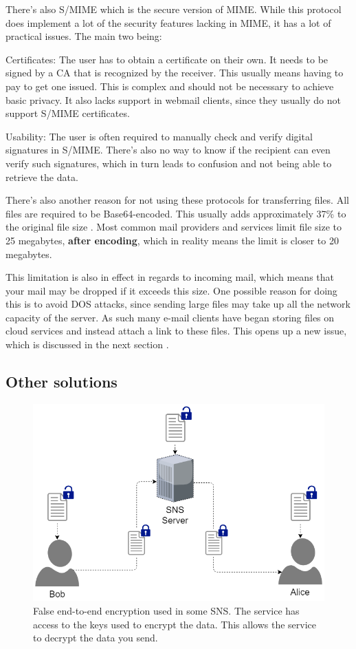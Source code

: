 There's also S/MIME which is the secure version of MIME. While this protocol does implement a lot of the security features lacking in MIME, it has a lot of practical issues. The main two being:

Certificates: The user has to obtain a certificate on their own. It needs to be signed by a CA that is recognized by the receiver. This usually means having to pay to get one issued. This is complex and should not be necessary to achieve basic privacy. It also lacks support in webmail clients, since they usually do not support S/MIME certificates.

Usability: The user is often required to manually check and verify digital signatures in S/MIME. There's also no way to know if the recipient can even verify such signatures, which in turn leads to confusion and not being able to retrieve the data.

There's also another reason for not using these protocols for transferring files. All files are required to be Base64-encoded. This usually adds approximately 37\% to the original file size \cite{sumartonoBase64CharacterEncoding2016}. Most common mail providers and services limit file size to 25 megabytes, \textbf{after encoding}, which in reality means the limit is closer to 20 megabytes.

This limitation is also in effect in regards to incoming mail, which means that your mail may be dropped if it exceeds this size. One possible reason for doing this is to avoid DOS attacks, since sending large files may take up all the network capacity of the server. As such many e-mail clients have began storing files on cloud services and instead attach a link to these files. This opens up a new issue, which is discussed in the next section \cite{SendAttachmentsYour}.
%
%
\subsection{Other solutions}
\label{sec:cloudetc}
%
\begin{figure}[th]
  \centering
  \includegraphics[width=\textwidth]{Figures/SNS}
  \decoRule
  \caption[SNS: False E2E encryption]{False end-to-end encryption used in some SNS. The service has access to the keys used to encrypt the data. This allows the service to decrypt the data you send.}
  \label{fig:sns}
\end{figure}

